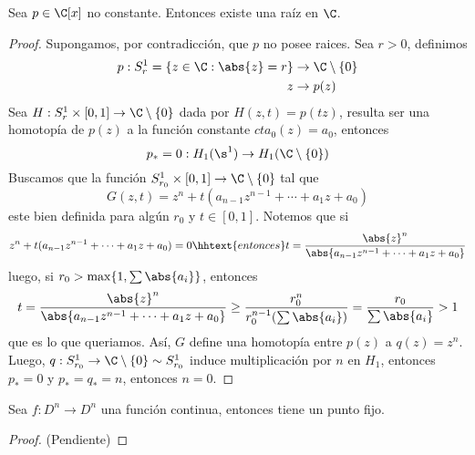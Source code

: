 \documentclass{article}
\begin{document}
\begin{teo}
    Sea $p\in\C[x]$ no constante. Entonces existe una raíz en $\C$.
\end{teo}

\begin{proof}
    Supongamos, por contradicción, que $p$ no posee raices. Sea $r>0$, definimos
    \begin{align*}
        p:S_{r}^{1}=\{z\in\C:\abs{z}=r\} &\to \C\setminus\{0\} \\
        z &\to p(z)
    \end{align*}
    Sea $H:S_{r}^{1}\times[0,1]\to\C\setminus\{0\}$ dada por $H(z,t)=p(tz)$, resulta ser una
    homotopía de $p(z)$ a la función constante $cta_{0}(z)=a_{0}$, entonces
    \begin{equation*}
        p_{*}=0:H_{1}(\s^{1})\to H_{1}(\C\setminus\{0\})
    \end{equation*}
    Buscamos que la función $S_{r_{0}}^{1}\times[0,1]\to\C\setminus\{0\}$ tal que
    \begin{equation*}
        G(z,t)=z^{n}+t(a_{n-1}z^{n-1}+\cdots+a_{1}z+a_{0})
    \end{equation*}
    este bien definida para algún $r_{0}$ y $t\in[0,1]$. Notemos que si
    \begin{equation*}
        z^{n}+t(a_{n-1}z^{n-1}+\cdots+a_{1}z+a_{0})=0
        \hhtext{entonces}
        t=\frac{\abs{z}^{n}}{\abs{a_{n-1}z^{n-1}+\cdots+a_{1}z+a_{0}}}
    \end{equation*}
    luego, si $r_{0}>\max\{1,\sum\abs{a_{i}}\}$, entonces
    \begin{align*}
        t=\frac{\abs{z}^{n}}{\abs{a_{n-1}z^{n-1}+\cdots+a_{1}z+a_{0}}}
        \geq\frac{r_{0}^{n}}{r_{0}^{n-1}(\sum\abs{a_{i}})}=\frac{r_{0}}{\sum\abs{a_{i}}}>1
    \end{align*}
    que es lo que queriamos. Así, $G$ define una homotopía entre $p(z)$ a $q(z)=z^{n}$. Luego,
    $q:S_{r_{0}}^{1}\to\C\setminus\{0\}\sim S_{r_{0}}^{1}$ induce multiplicación por $n$ en 
    $H_{1}$, entonces $p_{*}=0$ y $p_{*}=q_{*}=n$, entonces $n=0$.
\end{proof}

\begin{teo}
    Sea $f:D^{n}\to D^{n}$ una función continua, entonces tiene un punto fijo.
\end{teo}

\begin{proof}
    (Pendiente)
\end{proof}
\end{document}
